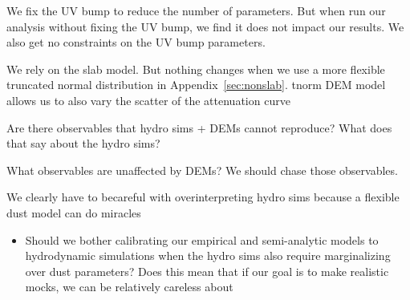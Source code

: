 We fix the UV bump to reduce the number of parameters. But when run our
analysis without fixing the UV bump, we find it does not impact our results.
We also get no constraints on the UV bump parameters. 

We rely on the slab model. But nothing changes when we use a more flexible
truncated normal distribution in Appendix~\ref{sec:nonslab}. tnorm DEM model allows us to also vary the
scatter of the attenuation curve 



Are there observables that hydro sims + DEMs cannot reproduce? What does that say about the hydro sims?

What observables are unaffected by DEMs? We should chase those observables. 

We clearly have to becareful with overinterpreting hydro sims because a flexible dust model can do miracles
\begin{itemize}
    \item Should we bother calibrating our empirical and semi-analytic models
        to hydrodynamic simulations when the hydro sims also require
        marginalizing over dust parameters? Does this mean that if our goal is
        to make realistic mocks, we can be relatively careless about 
\end{itemize}
